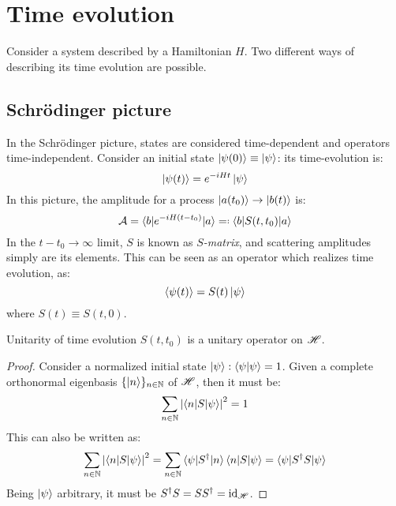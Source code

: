 
\section{Time evolution}

Consider a system described by a Hamiltonian $ H $. Two different ways of describing its time evolution are possible.

\subsection{Schrödinger picture}

In the Schrödinger picture, states are considered time-dependent and operators time-independent. Consider an initial state $ \ket{\psi(0)} \equiv \ket{\psi} $: its time-evolution is:
\begin{equation}
  \ket{\psi(t)} = e^{-i H t} \ket{\psi}
\end{equation}
In this picture, the amplitude for a process $ \ket{a(t_0)} \rightarrow \ket{b(t)} $ is:
\begin{equation}
  \mathcal{A} = \braket{b | e^{-i H (t - t_0)} | a} \eqdef \braket{b | S(t,t_0) | a}
\end{equation}
In the $ t - t_0 \rightarrow \infty $ limit, $ S $ is known as $ S $\textit{-matrix}, and scattering amplitudes simply are its elements. This can be seen as an operator which realizes time evolution, as:
\begin{equation}
  \braket{\psi(t)} = S(t) \ket{\psi}
\end{equation}
where $ S(t) \equiv S(t,0) $.

\begin{proposition}{Unitarity of time evolution}{}
  $ S(t,t_0) $ is a unitary operator on $ \mathscr{H} $.
\end{proposition}

\begin{proofbox}
  \begin{proof}
    Consider a normalized initial state $ \ket{\psi} : \braket{\psi | \psi} = 1 $. Given a complete orthonormal eigenbasis $ \{\ket{n}\}_{n \in \mathbb{N}} $ of $ \mathscr{H} $, then it must be:
    \begin{equation}
      \sum_{n \in \mathbb{N}} \left\lvert\braket{n | S | \psi}\right\rvert^2 = 1
    \end{equation}
    This can also be written as:
    \begin{equation}
      \sum_{n \in \mathbb{N}} \left\lvert\braket{n | S | \psi}\right\rvert^2 = \sum_{n \in \mathbb{N}} \braket{\psi | S^\dagger | n} \braket{n | S | \psi} = \braket{\psi | S^\dagger S | \psi}
    \end{equation}
    Being $ \ket{\psi} $ arbitrary, it must be $ S^\dagger S = S S^\dagger = \operatorname{id}_{\mathscr{H}} $.
  \end{proof}
\end{proofbox}


